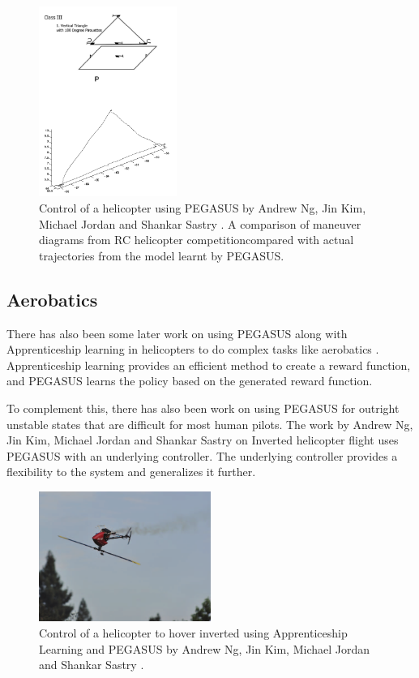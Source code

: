 \documentclass[BTech]{iitmdiss}
\begin{document}
\begin{figure}[h]
  \centering
    \includegraphics[width=0.4\textwidth]{pegasus_helicopter.png}
    \caption{Control of a helicopter using PEGASUS by Andrew Ng, Jin Kim, Michael Jordan and Shankar Sastry \cite{HelicopterPegasus}. A comparison of maneuver diagrams from RC helicopter competition\protect\footnotemark compared with actual trajectories from the model learnt by PEGASUS.}
\end{figure}

\subsection{Aerobatics}

There has also been some later work on using PEGASUS along with Apprenticeship learning in helicopters to do complex tasks like aerobatics \cite{ApprenticeshipHelicopterAerobatics}. Apprenticeship learning provides an efficient method to create a reward function, and PEGASUS learns the policy based on the generated reward function.

To complement this, there has also been work on using PEGASUS for outright unstable states that are difficult for most human pilots. The work by Andrew Ng, Jin Kim, Michael Jordan and Shankar Sastry on Inverted helicopter flight \cite{InvertedHelicopterFlight} uses PEGASUS with an underlying controller. The underlying controller provides a flexibility to the system and generalizes it further.

\begin{figure}[h]
  \centering
    \includegraphics[width=0.5\textwidth]{pegasus_inverted_helicopter.png}
    \caption{Control of a helicopter to hover inverted using Apprenticeship Learning and PEGASUS by Andrew Ng, Jin Kim, Michael Jordan and Shankar Sastry \cite{InvertedHelicopterFlight}.}
\end{figure}
\end{document}
